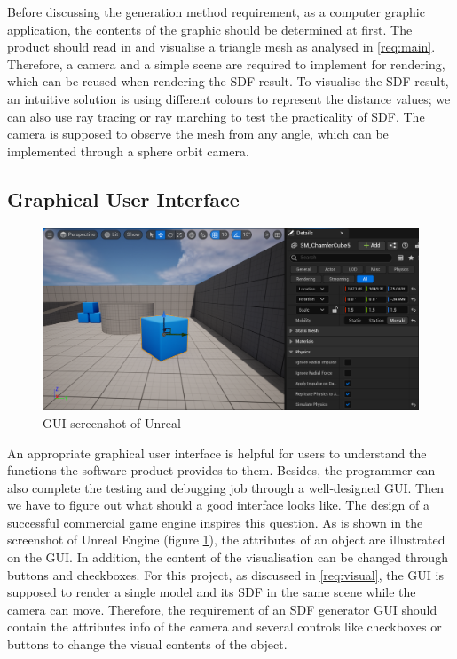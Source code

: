 Before discussing the generation method requirement, as a computer graphic application, the contents of the graphic should be determined at first. The product should read in and visualise a triangle mesh as analysed in \ref{req:main}. Therefore, a camera and a simple scene are required to implement for rendering, which can be reused when rendering the SDF result. To visualise the SDF result, an intuitive solution is using different colours to represent the distance values; we can also use ray tracing or ray marching to test the practicality of SDF. The camera is supposed to observe the mesh from any angle, which can be implemented through a sphere orbit camera.

\subsection{Graphical User Interface}
\label{req:gui}

\begin{figure}[htbp]
    \centering
    \includegraphics[width=16cm]{Images/Chap3/unreal.png}
    \caption{GUI screenshot of Unreal}
    \label{req:unreal}
\end{figure}

An appropriate graphical user interface is helpful for users to understand the functions the software product provides to them. Besides, the programmer can also complete the testing and debugging job through a well-designed GUI. Then we have to figure out what should a good interface looks like. The design of a successful commercial game engine inspires this question. As is shown in the screenshot of Unreal Engine (figure \ref{req:unreal}), the attributes of an object are illustrated on the GUI. In addition, the content of the visualisation can be changed through buttons and checkboxes. For this project, as discussed in \ref{req:visual}, the GUI is supposed to render a single model and its SDF in the same scene while the camera can move. Therefore, the requirement of an SDF generator GUI should contain the attributes info of the camera and several controls like checkboxes or buttons to change the visual contents of the object.

